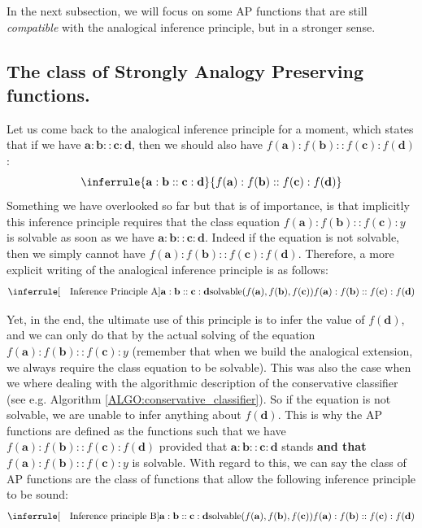 In the next subsection, we will focus on some AP functions that are still
\textit{compatible} with the analogical inference principle, but in a stronger
sense.

\subsection{The class of Strongly Analogy Preserving functions.}
\label{SEC:the_class_of_SAP_functions}

Let us come back to the analogical inference principle for a moment, which
states that if we have  $\mathbf{a}: \mathbf{b}:: \mathbf{c}: \mathbf{d}$, then
we should also have $f(\mathbf{a}) :f(\mathbf{b}) :: f(\mathbf{c}) :
f(\mathbf{d})$:
$$
\inferrule{\mathbf{a} : \mathbf{b} :: \mathbf{c} : \mathbf{d}}{ f(\mathbf{a}) :
f(\mathbf{b}) :: f(\mathbf{c}) : f(\mathbf{d}) }
$$
Something we have overlooked so far but that is of importance, is that
implicitly this inference principle requires that the class equation
$f(\mathbf{a}) : f(\mathbf{b}) :: f(\mathbf{c}) : y$ is solvable as soon as we
have $\mathbf{a} : \mathbf{b} :: \mathbf{c} : \mathbf{d}$. Indeed if the
equation is not solvable, then we simply cannot have $f(\mathbf{a}) :
f(\mathbf{b}) :: f(\mathbf{c}) : f(\mathbf{d})$.
Therefore, a more explicit writing of the analogical inference principle is as
follows:
$$
\inferrule[\text{~~ Inference Principle A}]{\mathbf{a} : \mathbf{b} :: \mathbf{c} :
\mathbf{d}}{\solvable(f(\mathbf{a}), f(\mathbf{b}),
f(\mathbf{c})) \\\\f(\mathbf{a}) : f(\mathbf{b}) :: f(\mathbf{c}) :
f(\mathbf{d}) }
$$


Yet, in the end, the ultimate use of this principle is to infer the value of
$f(\mathbf{d})$, and we can only do that by the actual solving of the equation
$f(\mathbf{a}) : f(\mathbf{b}) :: f(\mathbf{c}) : y$ (remember that when we
build the analogical extension, we always require the class equation to be
solvable). This was also the case when we where dealing with the algorithmic
description of the conservative classifier (see e.g. Algorithm
\ref{ALGO:conservative_classifier}).  So if the equation is not
solvable, we are unable to infer anything about $f(\mathbf{d})$. This is why
the AP functions are defined as the functions such that we have $f(\mathbf{a})
:f(\mathbf{b}) :: f(\mathbf{c}) : f(\mathbf{d})$ provided that
$\mathbf{a}: \mathbf{b}:: \mathbf{c}: \mathbf{d}$ stands \textbf{and that}
$f(\mathbf{a}) :f(\mathbf{b}) :: f(\mathbf{c}) : y$ is solvable. With regard to
this, we can say the class of AP functions are the class of functions that
allow the following inference principle to be sound: $$
\inferrule[\text{~~ Inference principle B}]{\mathbf{a} : \mathbf{b} ::
\mathbf{c} : \mathbf{d} \\\\ \solvable(f(\mathbf{a}), f(\mathbf{b}),
f(\mathbf{c}))}{f(\mathbf{a}) : f(\mathbf{b}) :: f(\mathbf{c}) : f(\mathbf{d})}
$$

